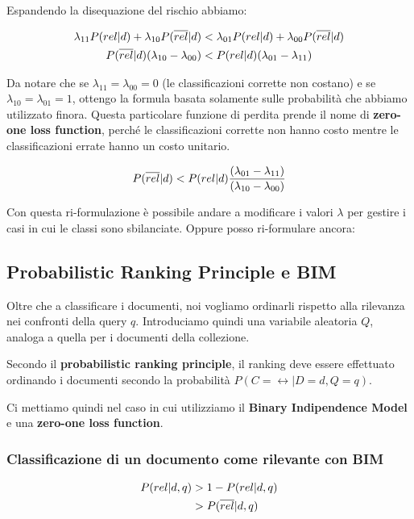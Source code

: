Espandendo la disequazione del rischio abbiamo:

\begin{align*}
\lambda_{11}P(rel|d) + \lambda_{10}P(\overline{rel}| d) &< \lambda_{01}P(rel|d) + \lambda_{00}P(\overline{rel} | d)  \\
P(\overline{rel}|d)(\lambda_{10} - \lambda_{00}) &< P(rel|d)(\lambda_{01} - \lambda_{11})
\end{align*}

\noindent Da notare che se $\lambda_{11} = \lambda_{00} = 0$ (le classificazioni corrette non costano) e se $\lambda_{10} = \lambda_{01} = 1$, ottengo la formula basata solamente sulle probabilità che abbiamo utilizzato finora. Questa particolare funzione di perdita prende il nome di \textbf{zero-one loss function}, perché le classificazioni corrette non hanno costo mentre le classificazioni errate hanno un costo unitario.

\begin{align*}
P(\overline{rel}|d) < P(rel|d) \frac{(\lambda_{01} - \lambda_{11})}{(\lambda_{10} - \lambda_{00})}
\end{align*}

\noindent Con questa ri-formulazione è possibile andare a modificare i valori $\lambda$ per gestire i casi in cui le classi sono sbilanciate.
Oppure posso ri-formulare ancora:


\subsection{Probabilistic Ranking Principle e BIM}

Oltre che a classificare i documenti, noi vogliamo ordinarli rispetto alla rilevanza nei confronti della query $q$. Introduciamo quindi una variabile aleatoria $Q$, analoga a quella per i documenti della collezione. 

Secondo il \textbf{probabilistic ranking principle}, il ranking deve essere effettuato ordinando i documenti secondo la probabilità $P(C = \rel | D= d, Q= q)$.

Ci mettiamo quindi nel caso in cui utilizziamo il \textbf{Binary Indipendence Model} e una \textbf{zero-one loss function}.

\subsubsection{Classificazione di un documento come rilevante con BIM}

\begin{align*}
	P(rel | d,q) &> 1 - P(rel | d, q) \\
	              &> P(\overline{rel} | d,q)
\end{align*}


